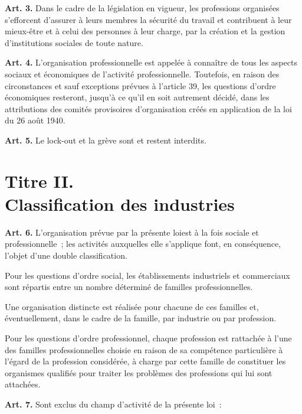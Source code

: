 \documentclass[french,twoside]{book} %
\newcommand{\labelchar}[1]{\textbf{\color{rubric} #1}}
\def\mednobreak{\ifdim\lastskip<\medskipamount
  \removelastskip\nopagebreak\medskip\fi}
\newcommand{\labelblock}[1]{\medbreak{\noindent\color{rubric}\bfseries #1}\par\mednobreak}
\begin{document}
\bigbreak
\noindent \labelchar{Art. 3.} Dans le cadre de la législation en vigueur, les professions organisées s’efforcent d’assurer à leurs membres la sécurité du travail et contribuent à leur mieux-être et à celui des personnes à leur charge, par la création et la gestion d’institutions sociales de toute nature.\par
\bigbreak
\noindent \labelchar{Art. 4.} L’organisation professionnelle est appelée à connaître de tous les aspects sociaux et économiques de l’activité professionnelle. Toutefois, en raison des circonstances et sauf exceptions prévues à l’article 39, les questions d’ordre économiques resteront, jusqu’à ce qu’il en soit autrement décidé, dans les attributions des comités provisoires d’organisation créés en application de la loi du 26 août 1940.\par
\bigbreak
\noindent \labelchar{Art. 5.} Le lock-out et la grève sont et restent interdits.
\section[Titre II. Classification des industries]{Titre II. \\
Classification des industries}\renewcommand{\leftmark}{Titre II. \\
Classification des industries}


\labelblock{Commerces et professions}

\noindent \labelchar{Art. 6.} L’organisation prévue par la présente loiest à la fois sociale et professionnelle ; les activités auxquelles elle s’applique font, en conséquence, l’objet d’une double classification.\par
Pour les questions d’ordre social, les établissements industriels et commerciaux sont répartis entre un nombre déterminé de familles professionnelles.\par
Une organisation distincte est réalisée pour chacune de ces familles et, éventuellement, dans le cadre de la famille, par industrie ou par profession.\par
Pour les questions d’ordre professionnel, chaque profession est rattachée à l’une des familles professionnelles choisie en raison de sa compétence particulière à l’égard de la profession considérée, à charge par cette famille de constituer les organismes qualifiés pour traiter les problèmes des professions qui lui sont attachées.\par
\bigbreak
\noindent \labelchar{Art. 7.} Sont exclus du champ d’activité de la présente loi :\par
\end{document}
